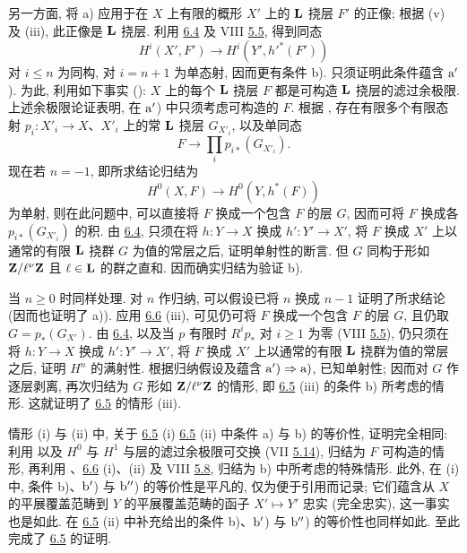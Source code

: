 另一方面, 将 a) 应用于在 $X$ 上有限的概形 $X'$ 上的 $\mathbf{L}$ 挠层 $F'$ 的正像; 根据  (v) 及  (iii), 此正像是 $\mathbf{L}$ 挠层. 利用 \hyperref[XII.lem6.4]{6.4} 及 VIII \hyperref[VIII.prop5.5]{5.5}, 得到同态
$$
H^{i}(X',F')\longrightarrow H^{i}(Y',{h'}^{\ast}(F'))
$$
对 $i\leq n$ 为同构, 对 $i=n+1$ 为单态射, 因而更有条件 b). 只须证明此条件蕴含 ${\rm a'}$). 为此, 利用如下事实 (): $X$ 上的每个 $\mathbf{L}$ 挠层 $F$ 都是可构造 $\mathbf{L}$ 挠层的滤过余极限. 上述余极限论证表明, 在 ${\rm a'}$) 中只须考虑可构造的 $F$. 根据 , 存在有限多个有限态射 $p_i:X'_i\rightarrow X$、$X'_i$ 上的常 $\mathbf{L}$ 挠层 $G_{X'_i}$, 以及单同态
$$
F\longrightarrow \prod_{i}p_{i\ast}(G_{X'_i}).
$$
现在\pageoriginale 若 $n=-1$, 即所求结论归结为
$$
H^{0}(X,F)\longrightarrow H^{0}(Y,h^{\ast}(F))
$$
为单射, 则在此问题中, 可以直接将 $F$ 换成一个包含 $F$ 的层 $G$, 因而可将 $F$ 换成各 $p_{i\ast}(G_{X'_i})$ 的积. 由 \hyperref[XII.lem6.4]{6.4}, 只须在将 $h:Y\rightarrow X$ 换成 $h':Y'\rightarrow X'$, 将 $F$ 换成 $X'$ 上以通常的有限 $\mathbf{L}$ 挠群 $G$ 为值的常层之后, 证明单射性的断言. 但 $G$ 同构于形如 $\mathbf{Z}/\ell^{\nu}\mathbf{Z}$ 且 $\ell\in\mathbf{L}$ 的群之直和. 因而确实归结为验证 b).

当 $n\geq0$ 时同样处理. 对 $n$ 作归纳, 可以假设已将 $n$ 换成 $n-1$ 证明了所求结论 (因而也证明了 a)). 应用 \hyperref[XII.cor6.6]{6.6} (iii), 可见仍可将 $F$ 换成一个包含 $F$ 的层 $G$, 且仍取 $G=p_{\ast}(G_{X'})$. 由 \hyperref[XII.lem6.4]{6.4}, 以及当 $p$ 有限时 $R^{i}p_{\ast}$ 对 $i\geq1$ 为零 (VIII \hyperref[VIII.prop5.5]{5.5}), 仍只须在将 $h:Y\rightarrow X$ 换成 $h':Y'\rightarrow X'$, 将 $F$ 换成 $X'$ 上以通常的有限 $\mathbf{L}$ 挠群为值的常层之后, 证明 $H^n$ 的满射性. 根据归纳假设及蕴含 ${\rm a')}\Rightarrow{\rm a)}$, 已知单射性; 因而对 $G$ 作逐层剥离, 再次归结为 $G$ 形如 $\mathbf{Z}/\ell^{\nu}\mathbf{Z}$ 的情形, 即 \hyperref[XII.prop6.5]{6.5} (iii) 的条件 b) 所考虑的情形. 这就证明了 \hyperref[XII.prop6.5]{6.5} 的情形 (iii).

情形 (i) 与 (ii) 中, 关于 \hyperref[XII.prop6.5]{6.5} (i) \resp \hyperref[XII.prop6.5]{6.5} (ii) 中条件 a) 与 b) 的等价性, 证明完全相同: 利用\pageoriginale {} 以及 $H^{0}$ 与 $H^1$ 与层的滤过余极限可交换 (VII \hyperref[VII.rem5.14]{5.14}), 归结为 $F$ 可构造的情形, 再利用 、\hyperref[XII.cor6.6]{6.6} (i)、(ii) 及 VIII \hyperref[VIII.rem5.8]{5.8}, 归结为 b) 中所考虑的特殊情形. 此外, 在 (i) 中, 条件 b)、${\rm b'}$) 与 ${\rm b''}$) 的等价性是平凡的, 仅为便于引用而记录; 它们蕴含从 $X$ 的平展覆盖范畴到 $Y$ 的平展覆盖范畴的函子 $X'\mapsto Y'$ 忠实 (\resp 完全忠实), 这一事实也是如此. 在 \hyperref[XII.prop6.5]{6.5} (ii) 中补充给出的条件 b)、${\rm b'}$) 与 ${\rm b''}$) 的等价性也同样如此. 至此完成了 \hyperref[XII.prop6.5]{6.5} 的证明.

